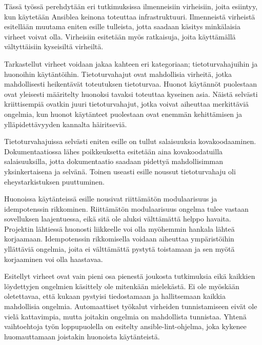 Tässä työssä perehdytään eri tutkimuksissa ilmenneisiin virheisiin, joita
esiintyy, kun käytetään Ansiblea keinona toteuttaa infrastruktuuri.
Ilmenneistä virheistä esitellään muutama eniten esille tulleista, jotta
saadaan käsitys minkälaisia virheet voivat olla. Virheisiin esitetään
myös ratkaisuja, joita käyttämällä vältyttäisiin kyseisiltä virheiltä.

Tarkastellut virheet voidaan jakaa kahteen eri kategoriaan; tietoturvahajuihin
ja huonoihin käytäntöihin. Tietoturvahajut ovat mahdollisia virheitä, jotka
mahdollisesti heikentävät toteutuksen tietoturvaa. Huonot käytännöt puolestaan
ovat yleisesti määritelty huonoksi tavaksi toteuttaa kyseinen asia. Näistä
selvästi kriittisempiä ovatkin juuri tietoturvahajut, jotka voivat aiheuttaa
merkittäviä ongelmia, kun huonot käytänteet puolestaan ovat enemmän
kehittämisen ja ylläpidettävyyden kannalta häiritseviä.

Tietoturvahajuissa selvästi eniten esille on tullut salaisuuksia
kovakoodaaminen. Dokumentaatiossa lähes poikkeuksetta esitetään aina
kovakoodatuilla salaisuuksilla, jotta dokumentaatio saadaan pidettyä
mahdollisimman yksinkertaisena ja selvänä. Toinen useasti esille noussut
tietoturvahaju oli eheystarkistuksen puuttuminen.

Huonoissa käytänteissä esille nousivat riittämätön modulaarisuus ja
idempotenssin rikkominen. Riittämätön modulaarisuus ongelma tulee vastaan
sovelluksen laajentuessa, eikä sitä ole aluksi välttämättä helppo havaita.
Projektin lähtiessä huonosti liikkeelle voi olla myöhemmin hankala lähteä
korjaamaan. Idempotenssin rikkomisella voidaan aiheuttaa ympäristöihin
yllättäviä ongelmia, joita ei välttämättä pystytä toistamaan ja sen myötä
korjaaminen voi olla haastavaa.

Esitellyt virheet ovat vain pieni osa pienestä joukosta tutkimuksia eikä
kaikkien löydettyjen ongelmien käsittely ole mitenkään mielekästä. Ei ole
myöskään oletettavaa, että kukaan pystyisi tiedostamaan ja hallitsemaan
kaikkia mahdollisia ongelmia. Automaattiset työkalut virheiden tunnistamiseen
eivät ole vielä kattavimpia, mutta joitakin ongelmia on mahdollista tunnistaa.
Yhtenä vaihtoehtoja työn loppupuolella on esitelty ansible-lint-ohjelma, joka
kykenee huomauttamaan joistakin huonoista käytänteistä.
